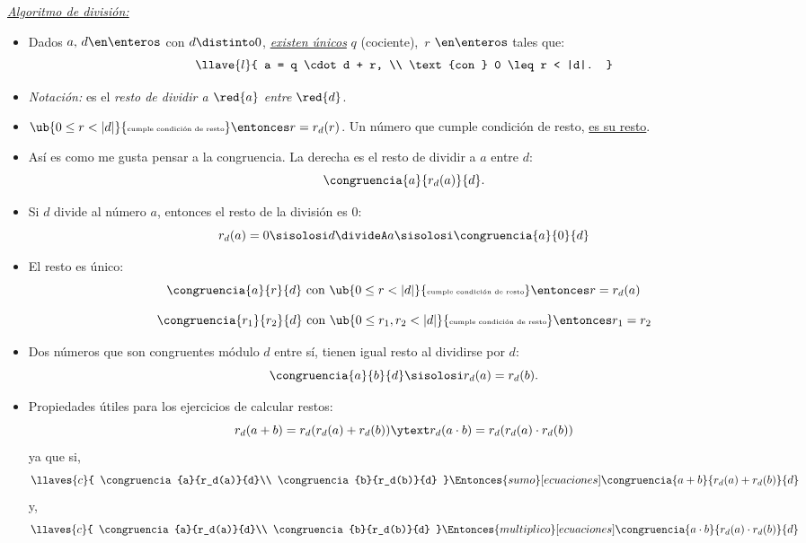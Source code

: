 \textit{\underline{Algoritmo de división:}}
\newcommand{\condicionResto}[1]{\ub{0 \leq #1 < |d|}{\text{\tiny cumple condición de resto}}}
\begin{itemize}
  \item
        Dados $a,\, d \en \enteros$ con $d \distinto 0$, \textit{\underline{existen únicos}} $q$ (cociente),\,
        $r$  $\en \enteros$ tales que:
        $$
          \llave{l}{
            a =  q \cdot d + r, \\
            \text{con } 0 \leq r < |d|.
          }
        $$

    \item \textit{Notación: }  es el \textit{resto de dividir a $\red{a}$ entre $\red{d}$}.


  \item $\condicionResto{r} \entonces r = r_d(r)$. Un número que cumple condición de resto, \underline{es su resto}.

  \item Así es como me gusta pensar a la congruencia. La derecha es el resto de dividir a $a$ entre $d$:
        $$
          \congruencia{a}{r_d(a)}{d}.
        $$

  \item Si $d$ divide al número $a$, entonces el resto de la división es 0:
        $$
          r_d(a) = 0 \sisolosi d \divideA a \sisolosi \congruencia{a}{0}{d}
        $$

  \item El resto es único:
        $$
          \congruencia{a}{r}{d} \text{ con }  \condicionResto{r} \entonces r = r_d(a)
        $$

        $$
          \congruencia{r_1}{r_2}{d} \text{ con } \condicionResto{r_1,r_2} \entonces r_1 = r_2
        $$

  \item Dos números que son congruentes módulo $d$ entre sí, tienen igual resto al dividirse por $d$:
        $$
          \congruencia{a}{b}{d} \sisolosi r_d(a) = r_d(b).
        $$

  \item Propiedades útiles para los ejercicios de calcular restos:
        $$
          r_d(a+b) = r_d(r_d(a) + r_d(b)) \ytext  r_d(a \cdot b) = r_d(r_d(a) \cdot r_d(b))
        $$
        ya que si,
        $$ \llaves{c}{
            \congruencia{a}{r_d(a)}{d}\\
            \congruencia{b}{r_d(b)}{d}
          }
          \Entonces{sumo}[ecuaciones]
          \congruencia{a + b}{r_d(a) + r_d(b)}{d}
        $$
        y,
        $$ \llaves{c}{
            \congruencia{a}{r_d(a)}{d}\\
            \congruencia{b}{r_d(b)}{d}
          }
          \Entonces{multiplico}[ecuaciones]
          \congruencia{a \cdot b}{r_d(a) \cdot r_d(b)}{d}
        $$
\end{itemize}\bigskip


